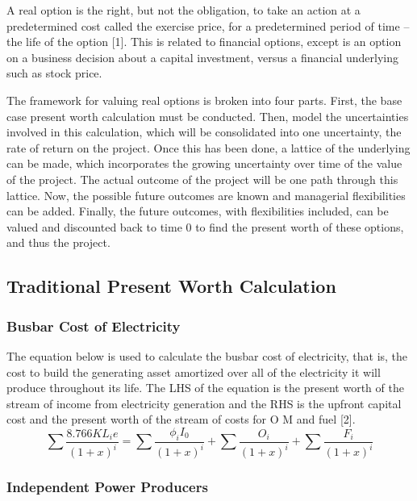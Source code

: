 A real option is the right, but not the obligation, to take an action at a predetermined cost called the exercise price, for a predetermined period of time – the life of the option [1]. This is related to financial options, except is an option on a business decision about a capital investment, versus a financial underlying such as stock price.   

The framework for valuing real options is broken into four parts.  First, the base case present worth calculation must be conducted.  Then, model the uncertainties involved in this calculation, which will be consolidated into one uncertainty, the rate of return on the project.  Once this has been done, a lattice of the underlying can be made, which incorporates the growing uncertainty over time of the value of the project.  The actual outcome of the project will be one path through this lattice.  Now, the possible future outcomes are known and managerial flexibilities can be added.  Finally, the future outcomes, with flexibilities included, can be valued and discounted back to time 0 to find the present worth of these options, and thus the project. 

\subsection{Traditional Present Worth Calculation}

\subsubsection{Busbar Cost of Electricity}

The equation below is used to calculate the busbar cost of electricity, that is, the cost to build the generating asset amortized over all of the electricity it will produce throughout its life.  The LHS of the equation is the present worth of the stream of income from electricity generation and the RHS is the upfront capital cost and the present worth of the stream of costs for O M and fuel [2].  
\begin{equation}
	\sum \frac{8.766 K L_i e}{ (1+x)^i }  =
		\sum \frac{ \phi_i I_0}{ (1+x)^i } +
		\sum \frac{ O_i }{ (1+x)^i } +
		\sum \frac{ F_i }{ (1+x)^i }
\end{equation}

\subsubsection{Independent Power Producers}

